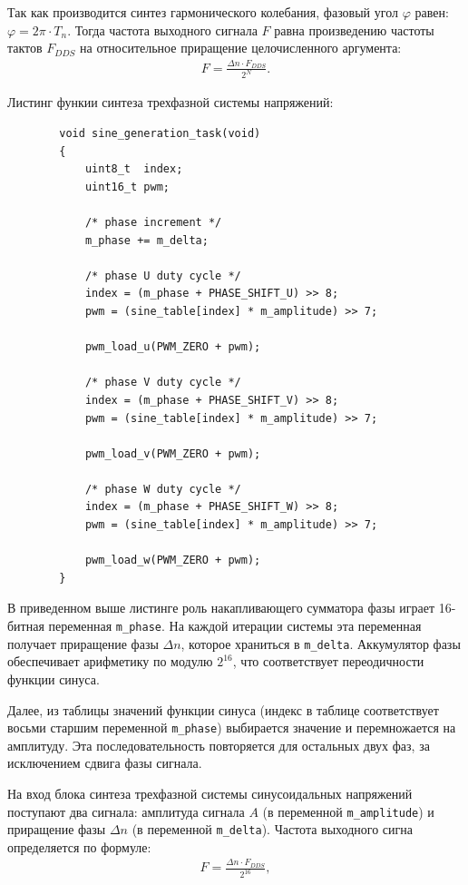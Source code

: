         Так как производится синтез гармонического колебания, фазовый угол
        $\varphi$ равен: $\varphi = 2\pi \cdot T_n$. Тогда частота выходного
        сигнала $F$ равна произведению частоты тактов $F_{DDS}$ на относительное
        приращение целочисленного аргумента:
        \begin{gather*}
            F = \frac{\Delta n \cdot F_{DDS}}{2^N}.
        \end{gather*}

        Листинг функии синтеза трехфазной системы напряжений:
        \begin{verbatim}
        void sine_generation_task(void)
        {
            uint8_t  index;
            uint16_t pwm;

            /* phase increment */
            m_phase += m_delta;
         
            /* phase U duty cycle */
            index = (m_phase + PHASE_SHIFT_U) >> 8;
            pwm = (sine_table[index] * m_amplitude) >> 7;

            pwm_load_u(PWM_ZERO + pwm);

            /* phase V duty cycle */
            index = (m_phase + PHASE_SHIFT_V) >> 8;
            pwm = (sine_table[index] * m_amplitude) >> 7;

            pwm_load_v(PWM_ZERO + pwm);

            /* phase W duty cycle */
            index = (m_phase + PHASE_SHIFT_W) >> 8;
            pwm = (sine_table[index] * m_amplitude) >> 7;

            pwm_load_w(PWM_ZERO + pwm);
        }
        \end{verbatim}

        В приведенном выше листинге роль накапливающего сумматора фазы играет
        16-битная переменная \verb"m_phase". На каждой итерации системы эта
        переменная получает приращение фазы $\Delta n$, которое храниться в
        \verb"m_delta". Аккумулятор фазы обеспечивает арифметику по модулю
        $2^{16}$, что соответствует переодичности функции синуса.

        Далее, из таблицы значений функции синуса (индекс в таблице
        соответствует восьми старшим переменной \verb"m_phase") выбирается
        значение и перемножается на амплитуду. Эта последовательность
        повторяется для остальных двух фаз, за исключением сдвига фазы сигнала.

        На вход блока синтеза трехфазной системы синусоидальных напряжений
        поступают два сигнала: амплитуда сигнала $A$ (в переменной
        \verb"m_amplitude") и приращение фазы $\Delta n$ (в переменной
        \verb"m_delta"). Частота выходного сигна определяется по формуле:
        \begin{gather*}
            F = \frac{\Delta n \cdot F_{DDS}}{2^{16}},
        \end{gather*}

